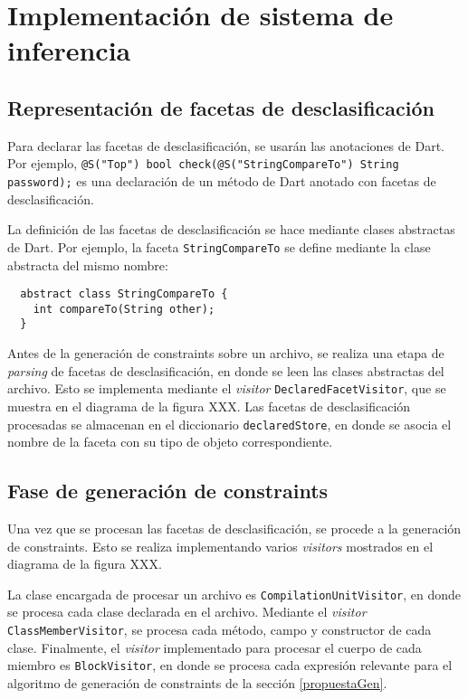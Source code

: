 \section{Implementación de sistema de inferencia}

\subsection{Representación de facetas de desclasificación}
Para declarar las facetas de desclasificación, se usarán las anotaciones de Dart. Por ejemplo, \texttt{@S("Top") bool check(@S("StringCompareTo") String password);} es una declaración de un método de Dart anotado con facetas de desclasificación.

La definición de las facetas de desclasificación se hace mediante clases abstractas de Dart. Por ejemplo, la faceta \texttt{StringCompareTo} se define mediante la clase abstracta del mismo nombre:

\begin{lstlisting}
  abstract class StringCompareTo {
    int compareTo(String other);
  }
\end{lstlisting}

Antes de la generación de constraints sobre un archivo, se realiza una etapa de \textit{parsing} de facetas de desclasificación, en donde se leen las clases abstractas del archivo. Esto se implementa mediante el \textit{visitor} \texttt{DeclaredFacetVisitor}, que se muestra en el diagrama de la figura XXX. Las facetas de desclasificación procesadas se almacenan en el diccionario \texttt{declaredStore}, en donde se asocia el nombre de la faceta con su tipo de objeto correspondiente.

\subsection{Fase de generación de constraints}
Una vez que se procesan las facetas de desclasificación, se procede a la generación de constraints. Esto se realiza implementando varios \textit{visitors} mostrados en el diagrama de la figura XXX.

La clase encargada de procesar un archivo es \texttt{CompilationUnitVisitor}, en donde se procesa cada clase declarada en el archivo. Mediante el \textit{visitor} \texttt{ClassMemberVisitor}, se procesa cada método, campo y constructor de cada clase. Finalmente, el \textit{visitor} implementado para procesar el cuerpo de cada miembro es \texttt{BlockVisitor}, en donde se procesa cada expresión relevante para el algoritmo de generación de constraints de la sección \ref{propuestaGen}.

